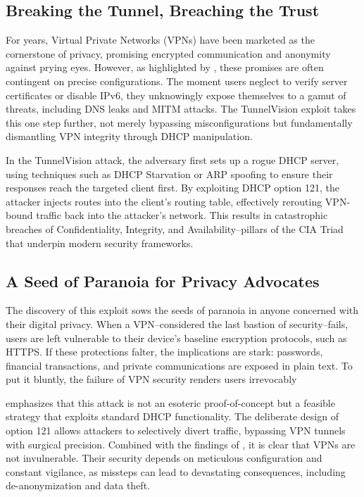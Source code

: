 \documentclass[conference]{IEEEtran}
\begin{document}
    \subsection{Breaking the Tunnel, Breaching the Trust}
    \label{subsec:Breaking_the_Tunnel}

        For years, Virtual Private Networks (VPNs) have been marketed as the cornerstone of privacy, promising encrypted communication and anonymity against prying eyes. However, as highlighted by \cite{Abbas2023}, these promises are often contingent on precise configurations. The moment users neglect to verify server certificates or disable IPv6, they unknowingly expose themselves to a gamut of threats, including DNS leaks and MITM attacks. The TunnelVision exploit takes this one step further, not merely bypassing misconfigurations but fundamentally dismantling VPN integrity through DHCP manipulation.  

        In the TunnelVision attack, the adversary first sets up a rogue DHCP server, using techniques such as DHCP Starvation or ARP spoofing to ensure their responses reach the targeted client first. By exploiting DHCP option 121, the attacker injects routes into the client’s routing table, effectively rerouting VPN-bound traffic back into the attacker’s network. This results in catastrophic breaches of Confidentiality, Integrity, and Availability--pillars of the CIA Triad that underpin modern security frameworks.  

    \subsection{A Seed of Paranoia for Privacy Advocates}
    \label{subsec:A_Seed_of_Paranoia}

        The discovery of this exploit sows the seeds of paranoia in anyone concerned with their digital privacy. When a VPN--considered the last bastion of security--fails, users are left vulnerable to their device’s baseline encryption protocols, such as HTTPS. If these protections falter, the implications are stark: passwords, financial transactions, and private communications are exposed in plain text. To put it bluntly, the failure of VPN security renders users irrevocably   

        \cite{Moratti2024} emphasizes that this attack is not an esoteric proof-of-concept but a feasible strategy that exploits standard DHCP functionality. The deliberate design of option 121 allows attackers to selectively divert traffic, bypassing VPN tunnels with surgical precision. Combined with the findings of \cite{Abbas2023}, it is clear that VPNs are not invulnerable. Their security depends on meticulous configuration and constant vigilance, as missteps can lead to devastating consequences, including de-anonymization and data theft.  
\end{document}
